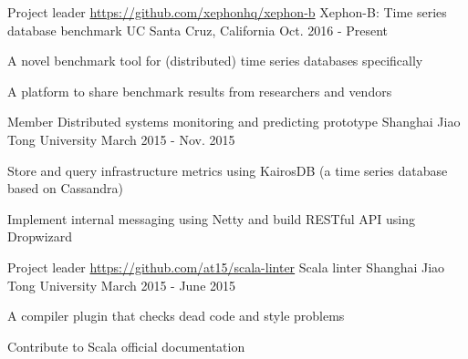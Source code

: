 

\begin{cventries}

  \cventry
    {Project leader \url{https://github.com/xephonhq/xephon-b}} %
    {Xephon-B: Time series database benchmark} %
    {UC Santa Cruz, California} %
    {Oct. 2016 - Present} %
    {
      \begin{cvitems} %
        \item {A novel benchmark tool for (distributed) time series databases specifically}
        \item {A platform to share benchmark results from researchers and vendors}
      \end{cvitems}
    }

  \cventry
    {Member}
    {Distributed systems monitoring and predicting prototype} %
    {Shanghai Jiao Tong University} %
    {March 2015 - Nov. 2015} %
    {
      \begin{cvitems} %
        \item {Store and query infrastructure metrics using KairosDB (a time series database based on Cassandra)}
        \item {Implement internal messaging using Netty and build RESTful API using Dropwizard}
      \end{cvitems}
    }

    \cventry
      {Project leader \url{https://github.com/at15/scala-linter}}
      {Scala linter} %
      {Shanghai Jiao Tong University} %
      {March 2015 - June 2015} %
      {
        \begin{cvitems} %
          \item {A compiler plugin that checks dead code and style problems}
          \item {Contribute to Scala official documentation}
        \end{cvitems}
      }


\end{cventries}
